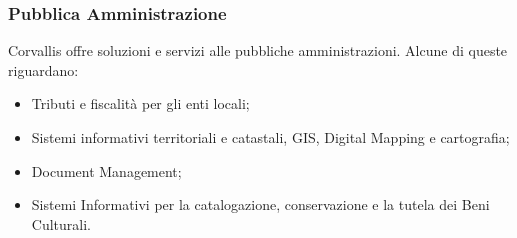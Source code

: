 \subsubsection{Pubblica Amministrazione}
\label{1.2.4}
Corvallis offre soluzioni e servizi alle pubbliche amministrazioni. Alcune di queste riguardano:
\begin{itemize}
\item Tributi e fiscalità per gli enti locali;
\item Sistemi informativi territoriali e catastali, GIS, Digital Mapping e cartografia;
\item Document Management;
\item Sistemi Informativi per la catalogazione, conservazione e la tutela dei Beni Culturali.\\
\end{itemize}
